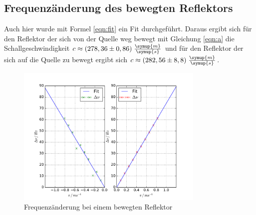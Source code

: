 \FloatBarrier
\subsection{Frequenzänderung des bewegten Reflektors}

Auch hier wurde mit Formel \eqref{eqn:fit} ein Fit durchgeführt. Daraus ergibt
sich für den Reflektor der sich von der Quelle weg bewegt mit Gleichung \eqref{eqn:a}
die Schallgeschwindigkeit $c \approx ( 278,36 \pm 0,86)\; \frac{\symup{m}}{\symup{s}}$
und für den Reflektor der sich auf die Quelle zu bewegt ergibt sich
$c \approx (282,56 \pm 8,8)\; \frac{\symup{m}}{\symup{s}}$.
\begin{figure}
  \centering
  \includegraphics[width = 0.8\textwidth]{plots/eplot.pdf}
  \caption{Frequenzänderung bei einem bewegten Reflektor}
  \label{fig:e}
\end{figure}



























%
